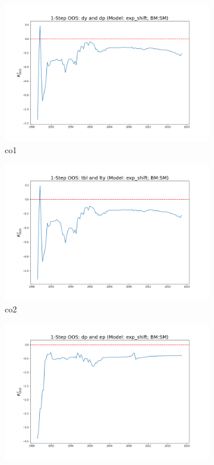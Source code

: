 \documentclass[a4paper,12pt,times,numbered,print,index]{report}
\numberwithin{equation}{section}
\begin{document}
\begin{figure}[!htbp]
	\centering
	\caption{OOS Results for Model with $f_5$}
	\begin{subfigure}[b]{0.42\linewidth}
		\includegraphics[width=0.9\linewidth]{OOS_plots/exp_shift_co1_SM.png}
		\caption{co1}
	\end{subfigure}
	\begin{subfigure}[b]{0.42\linewidth}
		\includegraphics[width=0.9\linewidth]{OOS_plots/exp_shift_co2_SM.png}
		\caption{co2}
	\end{subfigure}
	\begin{subfigure}[b]{0.42\linewidth}
		\includegraphics[width=0.9\linewidth]{OOS_plots/exp_shift_co3_SM.png}

\end{subfigure}
\end{figure}
\end{document}

